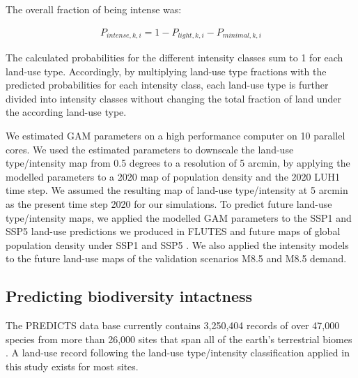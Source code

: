 \documentclass[titlesmallcaps,copyrightpage]{uomthesis}\usepackage[]{graphicx}\usepackage[]{color}
\begin{document}
The overall fraction of being intense was:

\begin{equation}
\begin{aligned}
P_{intense,k,i} = 1 - P_{light,k,i} - P_{minimal,k,i}
\end{aligned}
\end{equation}

The calculated probabilities for the different intensity classes sum to 1 for each land-use type. Accordingly, by multiplying land-use type fractions with the predicted probabilities for each intensity class, each land-use type is further divided into intensity classes without changing the total fraction of land under the according land-use type.

We estimated GAM parameters on a high performance computer on 10 parallel cores. We used the estimated parameters to downscale the land-use type/intensity map from 0.5 degrees to a resolution of 5 arcmin, by applying the modelled parameters to a 2020 map of population density \citep{gao_global_2020} and the 2020 LUH1 time step. We assumed the resulting map of land-use type/intensity at 5 arcmin as the present time step 2020 for our simulations. To predict future land-use type/intensity maps, we applied the modelled GAM parameters to the SSP1 and SSP5 land-use predictions we produced in FLUTES and future maps of global population density under SSP1 and SSP5 \citep{gao_global_2020}. We also applied the intensity models to the future land-use maps of the validation scenarios M8.5 and M8.5 demand.

\subsection{Predicting biodiversity intactness}

The PREDICTS data base currently contains 3,250,404 records of over 47,000 species from more than 26,000 sites that span all of the earth's terrestrial biomes \citep{hudson_database_2017}. A land-use record following the land-use type/intensity classification applied in this study exists for most sites.
\end{document}
